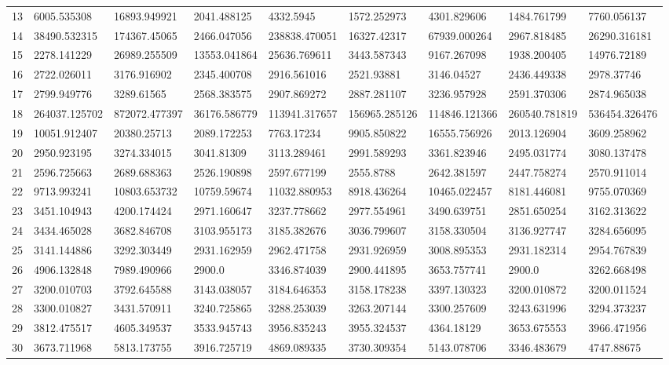 \begin{table*}[t]
\begin{tabular}{|p{0.8cm}|p{1.6cm}|p{1.6cm}|p{1.6cm}|p{1.6cm}|p{1.6cm}|p{1.6cm}|p{1.6cm}|p{1.6cm}|}
13  & 6005.535308 & 16893.949921 & 2041.488125 & 4332.5945 & 1572.252973 & 4301.829606 & 1484.761799 & 7760.056137 \\ 
14  & 38490.532315 & 174367.45065 & 2466.047056 & 238838.470051 & 16327.42317 & 67939.000264 & 2967.818485 & 26290.316181 \\ 
15  & 2278.141229 & 26989.255509 & 13553.041864 & 25636.769611 & 3443.587343 & 9167.267098 & 1938.200405 & 14976.72189 \\ 
16  & 2722.026011 & 3176.916902 & 2345.400708 & 2916.561016 & 2521.93881 & 3146.04527 & 2436.449338 & 2978.37746 \\ 
17  & 2799.949776 & 3289.61565 & 2568.383575 & 2907.869272 & 2887.281107 & 3236.957928 & 2591.370306 & 2874.965038 \\ 
18  & 264037.125702 & 872072.477397 & 36176.586779 & 113941.317657 & 156965.285126 & 114846.121366 & 260540.781819 & 536454.326476 \\ 
19  & 10051.912407 & 20380.25713 & 2089.172253 & 7763.17234 & 9905.850822 & 16555.756926 & 2013.126904 & 3609.258962 \\ 
20  & 2950.923195 & 3274.334015 & 3041.81309 & 3113.289461 & 2991.589293 & 3361.823946 & 2495.031774 & 3080.137478 \\ 
21  & 2596.725663 & 2689.688363 & 2526.190898 & 2597.677199 & 2555.8788 & 2642.381597 & 2447.758274 & 2570.911014 \\ 
22  & 9713.993241 & 10803.653732 & 10759.59674 & 11032.880953 & 8918.436264 & 10465.022457 & 8181.446081 & 9755.070369 \\ 
23  & 3451.104943 & 4200.174424 & 2971.160647 & 3237.778662 & 2977.554961 & 3490.639751 & 2851.650254 & 3162.313622 \\ 
24  & 3434.465028 & 3682.846708 & 3103.955173 & 3185.382676 & 3036.799607 & 3158.330504 & 3136.927747 & 3284.656095 \\ 
25  & 3141.144886 & 3292.303449 & 2931.162959 & 2962.471758 & 2931.926959 & 3008.895353 & 2931.182314 & 2954.767839 \\ 
26  & 4906.132848 & 7989.490966 & 2900.0 & 3346.874039 & 2900.441895 & 3653.757741 & 2900.0 & 3262.668498 \\ 
27  & 3200.010703 & 3792.645588 & 3143.038057 & 3184.646353 & 3158.178238 & 3397.130323 & 3200.010872 & 3200.011524 \\ 
28  & 3300.010827 & 3431.570911 & 3240.725865 & 3288.253039 & 3263.207144 & 3300.257609 & 3243.631996 & 3294.373237 \\ 
29  & 3812.475517 & 4605.349537 & 3533.945743 & 3956.835243 & 3955.324537 & 4364.18129 & 3653.675553 & 3966.471956 \\ 
30  & 3673.711968 & 5813.173755 & 3916.725719 & 4869.089335 & 3730.309354 & 5143.078706 & 3346.483679 & 4747.88675 \\ 
\hline

\end{tabular}
\end{table*}

